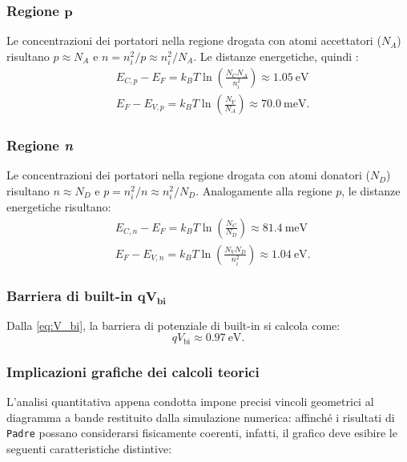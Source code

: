 \documentclass[a4paper,11pt]{report}
\begin{document}
\vspace{-0.1em}
\subsubsection{Regione $\bm{p}$}
Le concentrazioni dei portatori nella regione drogata con atomi accettatori ($N_A$) risultano $p \approx N_A$ e $n = {n_i^2}/{p} \approx {n_i^2}/{N_A}$. Le distanze energetiche, quindi :
\begin{equation}
    \begin{aligned}
        &E_{C,p} - E_{F} = k_B T \ln\left(\frac{N_C N_A}{n_i^2}\right) \approx \SI{1.05}{\electronvolt} \\
        &E_F - E_{V,p} = k_B T \ln\left(\frac{N_V}{N_A}\right) \approx \SI{70.0}{\milli\electronvolt}. 
    \end{aligned}
    \label{eq:energies_p_formulas}
\end{equation}


\subsubsection{Regione \textit{n}}
Le concentrazioni dei portatori nella regione drogata con atomi donatori ($N_D$) risultano $n \approx N_D$ e $p = {n_i^2}/{n} \approx {n_i^2}/{N_D}$. Analogamente alla regione $p$, le distanze energetiche risultano:
        \begin{equation}
            \begin{aligned}
                &E_{C,n} - E_{F} = k_B T \ln\left(\frac{N_C}{N_D}\right) \approx \SI{81.4}{\milli\electronvolt} \\
                &E_F - E_{V,n} = k_B T \ln\left(\frac{N_V N_D}{n_i^2}\right) \approx \SI{1.04}{\electronvolt}.
            \end{aligned}
            \label{eq:energies_n_formulas}
            \end{equation}

\subsubsection{Barriera di built-in $\bm{qV_{\text{bi}}}$}
Dalla \eqref{eq:V_bi}, la barriera di potenziale di built-in si calcola come:
\begin{equation}
qV_{\text{bi}} \approx \SI{0.97}{\electronvolt}.
\label{eq:qV_bi}
\end{equation}


\subsubsection{Implicazioni grafiche dei calcoli teorici}
L'analisi quantitativa appena condotta impone precisi vincoli geometrici al diagramma a bande restituito dalla simulazione numerica: affinché i risultati di \texttt{Padre} possano considerarsi fisicamente coerenti, infatti, il grafico deve esibire le seguenti caratteristiche distintive:
\end{document}
